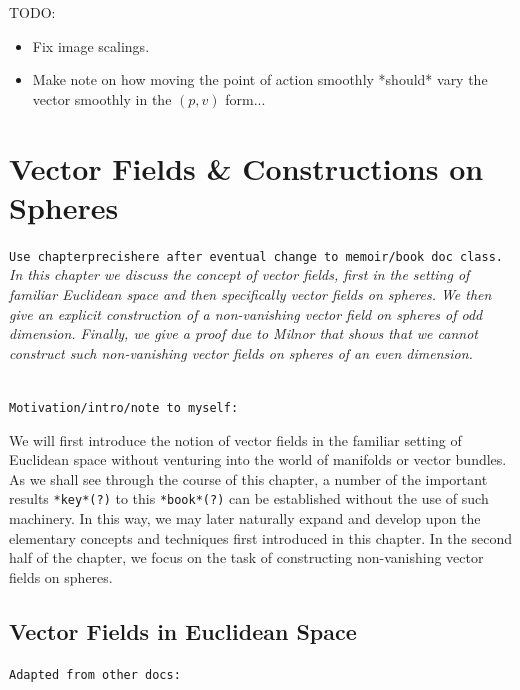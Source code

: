 TODO:
\begin{itemize}
\item Fix image scalings.
\item Make note on how moving the point of action smoothly *should* vary the vector smoothly in the $(p,v)$ form...
\end{itemize}
\section{Vector Fields \& Constructions on Spheres}
\begin{center}
\small
\justify
\texttt{Use chapterprecishere after eventual change to memoir/book doc class.}\\
\textit{In this chapter we discuss the concept of vector fields, first in the setting of familiar Euclidean space and then specifically vector fields on spheres. We then give an explicit construction of a non-vanishing vector field on spheres of odd dimension. Finally, we give a proof due to Milnor that shows that we cannot construct such non-vanishing vector fields on spheres of an even dimension.}
\normalsize
\end{center}
\hfill\\
\texttt{Motivation/intro/note to myself:}

We will first introduce the notion of vector fields in the familiar setting of Euclidean space without venturing into the world of manifolds or vector bundles. As we shall see through the course of this chapter, a number of the important results \texttt{*key*(?)} to this \texttt{*book*(?)} can be established without the use of such machinery. In this way, we may later naturally expand and develop upon the elementary concepts and techniques first introduced in this chapter. In the second half of the chapter, we focus on the task of constructing non-vanishing vector fields on spheres.
%
\subsection{Vector Fields in Euclidean Space}
\texttt{Adapted from other docs:}

